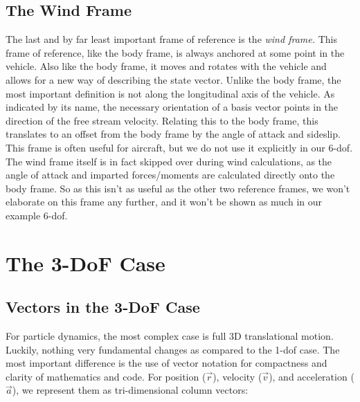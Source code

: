 \documentclass[12pt]{report}
\begin{document}
\subsection{The Wind Frame}
The last and by far least important frame of reference is the \textit{wind frame.} This frame of reference, like the body frame, is always anchored at some point in the vehicle. Also like the body frame, it moves and rotates with the vehicle and allows for a new way of describing the \gls{state vector}. Unlike the body frame, the most important definition is not along the longitudinal axis of the vehicle. As indicated by its name, the necessary orientation of a basis vector points in the direction of the free stream velocity. Relating this to the body frame, this translates to an offset from the body frame by the \gls{angle of attack} and sideslip. This frame is often useful for aircraft, but we do not use it explicitly in our 6-\gls{dof}. The wind frame itself is in fact skipped over during wind calculations, as the \gls{angle of attack} and imparted forces/moments are calculated directly onto the body frame. So as this isn’t as useful as the other two reference frames, we won’t elaborate on this frame any further, and it won’t be shown as much in our example 6-\gls{dof}.

\section{The 3-DoF Case}\label{sec: 3DoF Case}
\subsection{Vectors in the 3-DoF Case}
For particle dynamics, the most complex case is full 3D translational motion. Luckily, nothing very fundamental changes as compared to the 1-\gls{dof} case. The most important difference is the use of vector notation for compactness and clarity of mathematics and code. For position ($\vec{r}$), velocity ($\vec {v}$), and acceleration ($\vec{a}$), we represent them as tri-dimensional column vectors:
\end{document}
